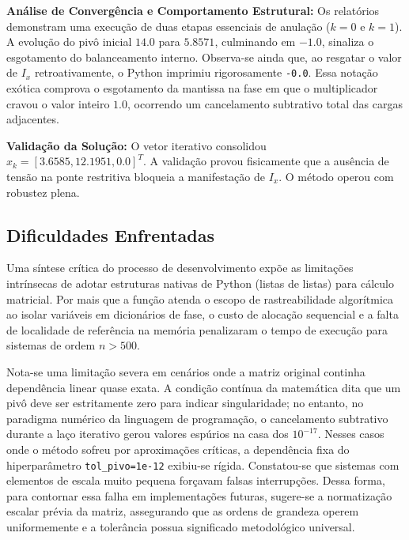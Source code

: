 \textbf{Análise de Convergência e Comportamento Estrutural:} Os relatórios demonstram uma execução de duas etapas essenciais de anulação ($k=0$ e $k=1$). A evolução do pivô inicial $14.0$ para $5.8571$, culminando em $-1.0$, sinaliza o esgotamento do balanceamento interno. Observa-se ainda que, ao resgatar o valor de $I_x$ retroativamente, o Python imprimiu rigorosamente \texttt{-0.0}. Essa notação exótica comprova o esgotamento da mantissa na fase em que o multiplicador cravou o valor inteiro $1.0$, ocorrendo um cancelamento subtrativo total das cargas adjacentes.

\textbf{Validação da Solução:} O vetor iterativo consolidou $x_k =[3.6585, 12.1951, 0.0]^T$. A validação provou fisicamente que a ausência de tensão na ponte restritiva bloqueia a manifestação de $I_x$. O método operou com robustez plena.


\subsection{Dificuldades Enfrentadas}

Uma síntese crítica do processo de desenvolvimento expõe as limitações intrínsecas de adotar estruturas nativas de Python (listas de listas) para cálculo matricial. Por mais que a função atenda o escopo de rastreabilidade algorítmica ao isolar variáveis em dicionários de fase, o custo de alocação sequencial e a falta de localidade de referência na memória penalizaram o tempo de execução para sistemas de ordem $n > 500$. 

Nota-se uma limitação severa em cenários onde a matriz original continha dependência linear quase exata. A condição contínua da matemática dita que um pivô deve ser estritamente zero para indicar singularidade; no entanto, no paradigma numérico da linguagem de programação, o cancelamento subtrativo durante a laço iterativo gerou valores espúrios na casa dos $10^{-17}$. Nesses casos onde o método sofreu por aproximações críticas, a dependência fixa do hiperparâmetro \texttt{tol\_pivo=1e-12} exibiu-se rígida. Constatou-se que sistemas com elementos de escala muito pequena forçavam falsas interrupções. Dessa forma, para contornar essa falha em implementações futuras, sugere-se a normatização escalar prévia da matriz, assegurando que as ordens de grandeza operem uniformemente e a tolerância possua significado metodológico universal.